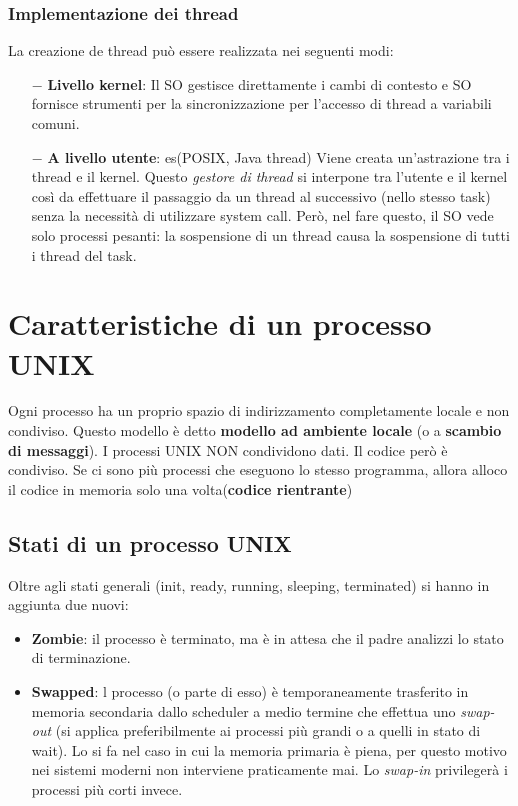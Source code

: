 \documentclass{article}
\begin{document}
\subsubsection{Implementazione dei thread}
La creazione de thread può essere realizzata nei seguenti modi:
\begin{itemize}
    \item [$-$] \textbf{Livello kernel}: Il SO 
    gestisce direttamente i cambi di contesto e SO fornisce
    strumenti per la sincronizzazione per l'accesso di thread a 
    variabili comuni.
    \item[$-$] \textbf{A livello utente}: es(POSIX, Java thread)
    Viene creata un'astrazione tra i thread e il kernel.
    Questo \textit{gestore di thread} si interpone tra l'utente 
    e il kernel così da effettuare il passaggio da un thread
    al successivo (nello stesso task) senza la necessità di utilizzare system call.   
    Però, nel fare questo, il SO vede solo processi pesanti: la sospensione
    di un thread causa la sospensione di tutti i thread del task.
\end{itemize}  

\pagebreak
\section{Caratteristiche di un processo UNIX}

\noindent Ogni processo ha un proprio spazio di indirizzamento
completamente locale e non condiviso. Questo modello è detto 
\textbf{modello ad ambiente locale} (o a \textbf{scambio di messaggi}).
I processi UNIX NON condividono dati.
Il codice però è condiviso. Se ci sono più processi che eseguono lo stesso 
programma, allora alloco il codice in memoria solo una volta(\textbf{codice rientrante})



\subsection{Stati di un processo UNIX}
Oltre agli stati generali (init, ready, running, sleeping, terminated)
si hanno in aggiunta due nuovi:
\begin{itemize}
    \item \textbf{Zombie}: il processo è terminato, ma è in attesa che il padre
     analizzi lo stato di terminazione.
    \item \textbf{Swapped}: l processo (o parte di esso) è temporaneamente
    trasferito in memoria secondaria dallo scheduler a medio termine che
    effettua uno \textit{swap-out} (si applica preferibilmente ai processi
    più grandi o a quelli in stato di wait). Lo si fa nel caso in cui la memoria
    primaria è piena, per questo motivo nei sistemi moderni non interviene praticamente mai. 
    Lo \textit{swap-in} privilegerà i processi più corti invece. 
    
\end{itemize}
\end{document}
